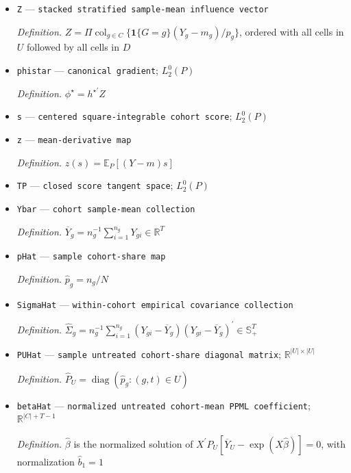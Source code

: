 \documentclass{article}
\begin{document}
\begin{itemize}
  \par\smallskip\noindent\emph{Definition.} \(F_{gt}=\mu_{gt}^{-1}\sum_{s=1}^T\operatorname{Cov}_P(Y_{gt},Y_{gs})\alpha^{\mathrm{CM}}_{gs}\)
  \item \texttt{Z} --- \texttt{stacked stratified sample-\allowbreak{}mean influence vector}
  \par\smallskip\noindent\emph{Definition.} \(Z=\Pi\operatorname{col}_{g\in C}\{\mathbf 1\{G=g\}(Y_g-m_g)/p_g\}\), ordered with all cells in \(U\) followed by all cells in \(D\)
  \item \texttt{phistar} --- \texttt{canonical gradient}; \(L_2^0(P)\)
  \par\smallskip\noindent\emph{Definition.} \(\phi^{\star}=h^{\star\prime}Z\)
  \item \texttt{s} --- \texttt{centered square-\allowbreak{}integrable cohort score}; \(L_2^0(P)\)
  \item \texttt{z} --- \texttt{mean-\allowbreak{}derivative map}
  \par\smallskip\noindent\emph{Definition.} \(z(s)=\mathbb E_P[(Y-m)s]\)
  \item \texttt{TP} --- \texttt{closed score tangent space}; \(L_2^0(P)\)
  \item \texttt{Ybar} --- \texttt{cohort sample-\allowbreak{}mean collection}
  \par\smallskip\noindent\emph{Definition.} \(\overline Y_g=n_g^{-1}\sum_{i=1}^{n_g}Y_{gi}\in\mathbb R^T\)
  \item \texttt{pHat} --- \texttt{sample cohort-\allowbreak{}share map}
  \par\smallskip\noindent\emph{Definition.} \(\widehat p_g=n_g/N\)
  \item \texttt{SigmaHat} --- \texttt{within-\allowbreak{}cohort empirical covariance collection}
  \par\smallskip\noindent\emph{Definition.} \(\widehat\Sigma_g=n_g^{-1}\sum_{i=1}^{n_g}(Y_{gi}-\overline Y_g)(Y_{gi}-\overline Y_g)^{\prime}\in\mathbb S_+^T\)
  \item \texttt{PUHat} --- \texttt{sample untreated cohort-\allowbreak{}share diagonal matrix}; \(\mathbb R^{|U|\times|U|}\)
  \par\smallskip\noindent\emph{Definition.} \(\widehat P_U=\operatorname{diag}(\widehat p_g:(g,t)\in U)\)
  \item \texttt{betaHat} --- \texttt{normalized untreated cohort-\allowbreak{}mean PPML coefficient}; \(\mathbb R^{|C|+T-1}\)
  \par\smallskip\noindent\emph{Definition.} \(\widehat\beta\) is the normalized solution of \(X^{\prime}\widehat P_U[\overline Y_U-\exp(X\widehat\beta)]=0\), with normalization \(\widehat b_1=1\)

\end{itemize}
\end{document}
